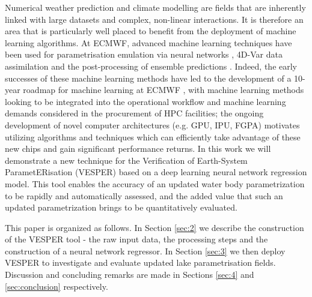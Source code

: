 \documentclass[hess, twostagejnl]{copernicus}
\begin{document}
\noindent Numerical weather prediction and climate modelling are fields that are inherently linked with large datasets and complex, non-linear interactions. It is therefore an area that is particularly well placed to benefit from the deployment of machine learning algorithms. At ECMWF, advanced machine learning techniques have been used for parametrisation emulation via neural networks \citep{Chantry2021}, 4D-Var data assimilation \citep{Hatfield2021} and the post-processing of ensemble predictions \citep{Hewson2021}. Indeed, the early successes of these machine learning methods have led to the development of a 10-year roadmap for machine learning at ECMWF \citep{p19877}, with machine learning methods looking to be integrated into the operational workflow and machine learning demands considered in the procurement of HPC facilities; the ongoing development of novel computer architectures (e.g. GPU, IPU, FGPA) motivates utilizing algorithms and techniques which can efficiently take advantage of these new chips and gain significant performance returns. In this work we will demonstrate a new technique for the Verification of Earth-System ParametERisation (VESPER) based on a deep learning neural network regression model. This tool enables the accuracy of an updated water body parametrization to be rapidly and automatically assessed, and the added value that such an updated parametrization brings to be quantitatively evaluated. \newline 


\noindent This paper is organized as follows. In Section \ref{sec:2} we describe the construction of the VESPER tool - the raw input data, the processing steps and the construction of a neural network regressor. In Section \ref{sec:3} we then deploy VESPER to investigate and evaluate updated lake parametrisation fields. Discussion and concluding remarks are made in Sections \ref{sec:4} and \ref{sec:conclusion} respectively. 
\end{document}
